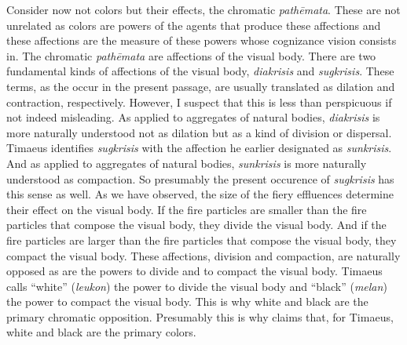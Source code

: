 Consider now not colors but their effects, the chromatic \emph{pathēmata}. These are not unrelated as colors are powers of the agents that produce these affections and these affections are the measure of these powers whose cognizance vision consists in. The chromatic \emph{pathēmata} are affections of the visual body. There are two fundamental kinds of affections of the visual body, \emph{diakrisis} and \emph{sugkrisis}. These terms, as the occur in the present passage, are usually translated as dilation and contraction, respectively. However, I suspect that this is less than perspicuous if not indeed misleading. As applied to aggregates of natural bodies, \emph{diakrisis} is more naturally understood not as dilation but as a kind of division or dispersal. Timaeus identifies \emph{sugkrisis} with the affection he earlier designated as \emph{sunkrisis}. And as applied to aggregates of natural bodies, \emph{sunkrisis} is more naturally understood as compaction. So presumably the present occurence of \emph{sugkrisis} has this sense as well. As we have observed, the size of the fiery effluences determine their effect on the visual body. If the fire particles are smaller than the fire particles that compose the visual body, they divide the visual body. And if the fire particles are larger than the fire particles that compose the visual body, they compact the visual body. These affections, division and compaction, are naturally opposed as are the powers to divide and to compact the visual body. Timaeus calls ``white'' (\emph{leukon}) the power to divide the visual body and ``black'' (\emph{melan}) the power to compact the visual body. This is why white and black are the primary chromatic opposition. Presumably this is why \citet[480--1]{Taylor:1928qb} claims that, for Timaeus, white and black are the primary colors. 

